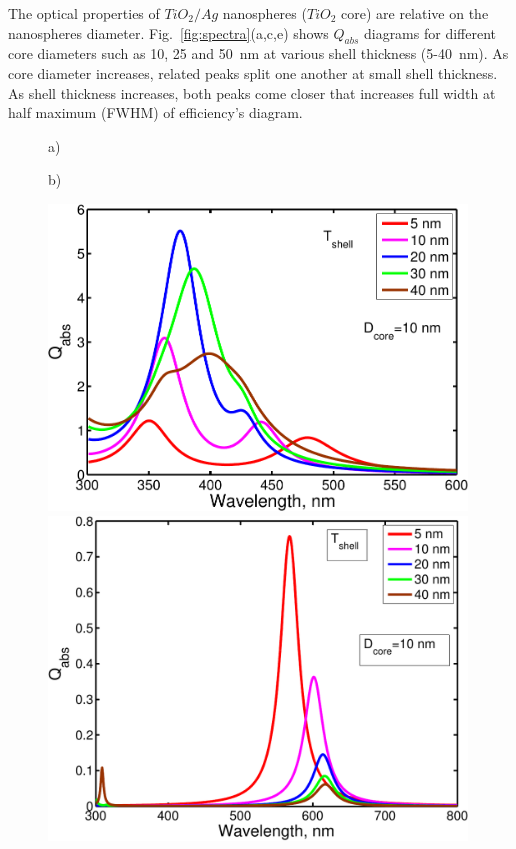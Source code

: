 \documentclass[aip,jap,reprint]{revtex4-1}
\begin{document}
The optical properties of $TiO_2/Ag$ nanospheres ($TiO_2$ core) are relative
on the nanospheres diameter. Fig.~\ref{fig:spectra}(a,c,e) shows $Q_{abs}$ diagrams for different
core diameters such as 10, 25 and 50~nm at various shell thickness
(5-40~nm). As core diameter increases, related peaks split one another
at small shell thickness. As shell thickness increases, both peaks come
closer that increases full width at half maximum (FWHM) of
efficiency's diagram. 

\begin{figure}
  \begin{minipage}[h]{0.235\textwidth}
    \begin{flushleft}
      a)
    \end{flushleft}
  \end{minipage}
  \hfill
  \begin{minipage}[h]{0.235\textwidth}
    \begin{flushleft}
      b)
    \end{flushleft}
  \end{minipage}
  \begin{minipage}[h]{0.235\textwidth}
    \includegraphics[width=0.99\textwidth]{Qabs_core_10nm}
  \end{minipage}
  \hfill
  \begin{minipage}[h]{0.235\textwidth}
    \includegraphics[width=0.99\textwidth]{Qabs_Ag_TiO_10_t}

\end{minipage}
\end{figure}
\end{document}
